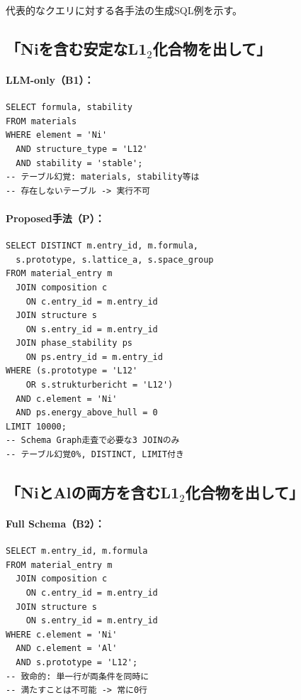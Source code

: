 \documentclass[5p,twocolumn]{elsarticle}
\begin{document}
代表的なクエリに対する各手法の生成SQL例を示す。

\lstset{basicstyle=\ttfamily\scriptsize,breaklines=true,columns=flexible,numbers=none,frame=single,xleftmargin=0pt,xrightmargin=0pt,linewidth=\columnwidth}

\subsection{「Niを含む安定なL1$_2$化合物を出して」}

\paragraph{LLM-only（B1）：}
\begin{lstlisting}
SELECT formula, stability
FROM materials
WHERE element = 'Ni'
  AND structure_type = 'L12'
  AND stability = 'stable';
-- テーブル幻覚: materials, stability等は
-- 存在しないテーブル -> 実行不可
\end{lstlisting}

\paragraph{Proposed手法（P）：}
\begin{lstlisting}
SELECT DISTINCT m.entry_id, m.formula,
  s.prototype, s.lattice_a, s.space_group
FROM material_entry m
  JOIN composition c
    ON c.entry_id = m.entry_id
  JOIN structure s
    ON s.entry_id = m.entry_id
  JOIN phase_stability ps
    ON ps.entry_id = m.entry_id
WHERE (s.prototype = 'L12'
    OR s.strukturbericht = 'L12')
  AND c.element = 'Ni'
  AND ps.energy_above_hull = 0
LIMIT 10000;
-- Schema Graph走査で必要な3 JOINのみ
-- テーブル幻覚0%, DISTINCT, LIMIT付き
\end{lstlisting}

\subsection{「NiとAlの両方を含むL1$_2$化合物を出して」}

\paragraph{Full Schema（B2）：}
\begin{lstlisting}
SELECT m.entry_id, m.formula
FROM material_entry m
  JOIN composition c
    ON c.entry_id = m.entry_id
  JOIN structure s
    ON s.entry_id = m.entry_id
WHERE c.element = 'Ni'
  AND c.element = 'Al'
  AND s.prototype = 'L12';
-- 致命的: 単一行が両条件を同時に
-- 満たすことは不可能 -> 常に0行
\end{lstlisting}
\end{document}
